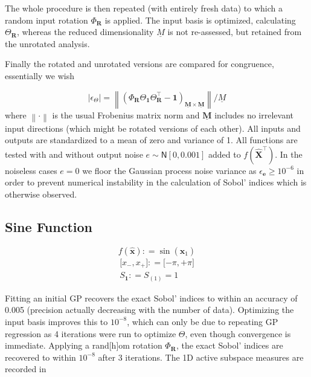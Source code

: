 \documentclass[preprint,12pt]{elsarticle}
\newcommand*{\M}[1]{\ensuremath{#1}\xspace}
\newcommand*{\vr}[1]{\M{\mathbf{#1}}}
\newcommand*{\deq}{\M{\mathrel{\mathop:}=}}
\newcommand*{\gauss}[2]{\mathsf{N}\!\left\lbrack{} #1 , #2 \right\rbrack}
\newcommand*{\modulus}[1]{\M{\left\lvert#1\right\rvert}}
\newcommand*{\norm}[1]{\M{\left\lVert#1\right\rVert}}
\begin{document}
        The whole procedure is then repeated (with entirely fresh data) to which a random input rotation $\Phi_{\vr{R}}$ is applied. The input basis is optimized, calculating $\Theta_{\vr{R}}$, whereas the reduced dimensionality \M{\underline{M}} is not re-assessed, but retained from the unrotated analysis.

        Finally the rotated and unrotated versions are compared for congruence, essentially we wish


        \begin{equation}
            \modulus{\epsilon_{\Theta}} = \norm{\left(\Phi_{\vr{R}} \Theta_{\vr{1}} \Theta_{\vr{R}}^{\intercal} - \vr{1}\right)_{\underline{\vr{M}}\times\underline{\vr{M}}}} / \underline{M}
        \end{equation}
        where \M{\norm{\cdot}} is the usual Frobenius matrix norm and \M{\underline{\vr{M}}} includes no irrelevant input directions (which might be rotated versions of each other). 
        All inputs and outputs are standardized to a mean of zero and variance of 1. All functions are tested with and without output noise \M{e \sim \gauss{0}{0.001}} added to \M{f(\vr{\hat{X}}^{\intercal})}. 
        In the noiseless cases \M{e=0} we floor the Gaussian process noise variance as \M{\epsilon_\vr{e} \geq 10^{-6}} in order to prevent numerical instability in the calculation of Sobol' indices which is otherwise observed.

        \subsection{Sine Function} \label{sub:Results:Sin}
            \begin{equation} \label{def:Sin}
                f(\vr{\hat{x}}) \deq \sin(\vr{\hat{x}}_1)
            \end{equation}
            \begin{gather*}
                \lbrack x_-, x_+ \rbrack \deq \lbrack -\pi, +\pi \rbrack \\
                S_{\vr{1}} \deq S_{(1)} = 1
            \end{gather*}



            Fitting an initial GP recovers the exact Sobol' indices to within an accuracy of 0.005 (precision actually decreasing with the number of data). Optimizing the input basis improves this to $10^{-8}$, which can only be due to repeating GP regression as 4 iterations were run to optimize $\Theta$, even though convergence is immediate.
            Applying a rand[h]om rotation \M{\Phi_{\vr{R}}}, the exact Sobol' indices are recovered to within $10^{-8}$ after 3 iterations. The 1D active subspace measures are recorded in 
\end{document}

